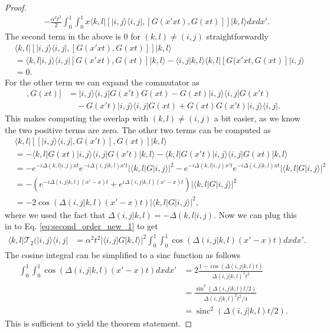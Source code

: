 \documentclass[
 amsmath,amssymb,
 aps,
onecolumn, 
nofootinbib]{revtex4-2}
\newcommand{\ket}[1]{|#1\rangle}
\newcommand{\bra}[1]{\langle #1|}
\newcommand{\braket}[2]{\langle #1|#2\rangle}
\newcommand{\ketbra}[2]{| #1\rangle\! \langle #2|}
\newcommand{\abs}[1]{\left| #1 \right|}
\DeclareMathOperator{\sinc}{sinc}
\begin{document}
\begin{proof}
\begin{align}
        &- \frac{\alpha^2 t^2}{2} \int_0^1 \int_0^1 x \bra{k,l} [\ketbra{i,j}{i, j}, [G(x' xt), G(x t)]] \ket{k, l} dx dx'. \label{eq:second_order_new_1}
    \end{align}
    The second term in the above is 0 for $(k, l) \neq (i,j)$ straightforwardly
    \begin{align}
        &\bra{k,l} [\ketbra{i,j}{i,j}, [G(x' x t), G(x t)]] \ket{k,l} \\
        &= \braket{k,l}{i,j} \bra{i,j} [G(x' x t), G(xt)] \ket{k,l} - \braket{i,j}{k,l} \bra{k, l} [G(x' x t, G(xt)] \ket{i,j} \\
        &= 0.
    \end{align}
    For the other term we can expand the commutator as 
    \begin{align}
        [[\ketbra{i,j}{i,j}, G(x' t)], G(xt)] &= \ketbra{i,j}{i,j} G(x't) G(xt) - G(xt) \ketbra{i,j}{i,j} G(x't) \\
        &\quad- G(x't) \ketbra{i,j}{i,j} G(xt) + G(xt) G(x' t) \ketbra{i,j}{i,j}.
    \end{align}
    This makes computing the overlap with $(k,l) \neq (i,j)$ a bit easier, as we know the two positive terms are zero. The other two terms can be computed as
    \begin{align}
    &\bra{k,l} [[\ketbra{i, j}{i, j}, G(x' t)], G(x t)] \ket{k,l} \\
    &= -\bra{k,l} G(xt) \ket{i,j} \bra{i,j} G(x't) \ket{k,l} - \bra{k,l} G(x't) \ket{i,j} \bra{i,j} G(xt) \ket{k,l} \\
    &= - e^{-i \Delta(k,l | i,j) x t} e^{-i \Delta(i,j | k,l) x' t} \abs{\bra{k,l} G \ket{i,j}}^2 - e^{-i \Delta(k,l | i, j) x' t} e^{-i \Delta(i,j | k,l) x t} \abs{\bra{k,l} G \ket{i,j}}^2 \\
    &= - \left(e^{-i \Delta(i, j| k,l) (x' - x) t} + e^{i \Delta(i,j| k,l) (x' - x) t} \right) \abs{\bra{k,l} G \ket{i,j}}^2 \\
    &= - 2 \cos \left( \Delta(i,j | k, l) (x' - x) t \right) \abs{\bra{k,l} G \ket{i,j}}^2,
    \end{align}
    where we used the fact that $\Delta(i,j |k,l) = - \Delta(k,l| i,j)$. Now we can plug this in to Eq. \eqref{eq:second_order_new_1} to get 
    \begin{align}
        \bra{k,l} \mathcal{T}_2(\ketbra{i,j}{i,j} &= \alpha^2 t^2 \abs{\bra{i,j} G \ket{k,l}}^2 \int_0^1 \int_0^1 \cos(\Delta(i,j | k,l) (x' - x) t) dx dx'.
    \end{align}
    The cosine integral can be simplified to a sinc function as follows
    \begin{align}
        \int_0^1 \int_0^1 \cos(\Delta(i,j | k,l) (x' - x) t) dx dx' &= 2\frac{1 - \cos(\Delta(i,j| k,l) t)}{\Delta(i,j| k,l)^2 t^2}  \\
        &= \frac{\sin^2 (\Delta(i,j |k, l) t/2)}{\Delta(i,j | k,l)^2 t^2 /4} \\
        &= \sinc^2(\Delta(i,j | k,l) t/2).
    \end{align}
    This is sufficient to yield the theorem statement.
\end{proof}
\end{document}
